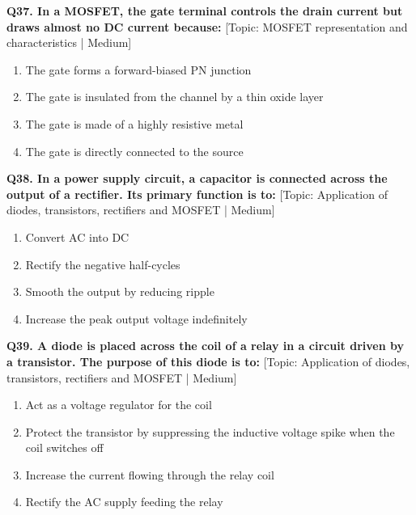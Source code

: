 \noindent\textbf{Q37. In a MOSFET, the gate terminal controls the drain current but draws almost no DC current because:} \hfill [Topic: MOSFET representation and characteristics | Medium]
\begin{enumerate}[label=(\alph*),topsep=2pt,itemsep=1pt,partopsep=0pt,parsep=0pt]
    \item {The gate forms a forward-biased PN junction}
    \item {The gate is insulated from the channel by a thin oxide layer}
    \item {The gate is made of a highly resistive metal}
    \item {The gate is directly connected to the source}
\end{enumerate}
\vspace{2mm}

\noindent\textbf{Q38. In a power supply circuit, a capacitor is connected across the output of a rectifier. Its primary function is to:} \hfill [Topic: Application of diodes, transistors, rectifiers and MOSFET | Medium]
\begin{enumerate}[label=(\alph*),topsep=2pt,itemsep=1pt,partopsep=0pt,parsep=0pt]
    \item {Convert AC into DC}
    \item {Rectify the negative half-cycles}
    \item {Smooth the output by reducing ripple}
    \item {Increase the peak output voltage indefinitely}
\end{enumerate}
\vspace{2mm}

\noindent\textbf{Q39. A diode is placed across the coil of a relay in a circuit driven by a transistor. The purpose of this diode is to:} \hfill [Topic: Application of diodes, transistors, rectifiers and MOSFET | Medium]
\begin{enumerate}[label=(\alph*),topsep=2pt,itemsep=1pt,partopsep=0pt,parsep=0pt]
    \item {Act as a voltage regulator for the coil}
    \item {Protect the transistor by suppressing the inductive voltage spike when the coil switches off}
    \item {Increase the current flowing through the relay coil}
    \item {Rectify the AC supply feeding the relay}
\end{enumerate}
\vspace{2mm}


